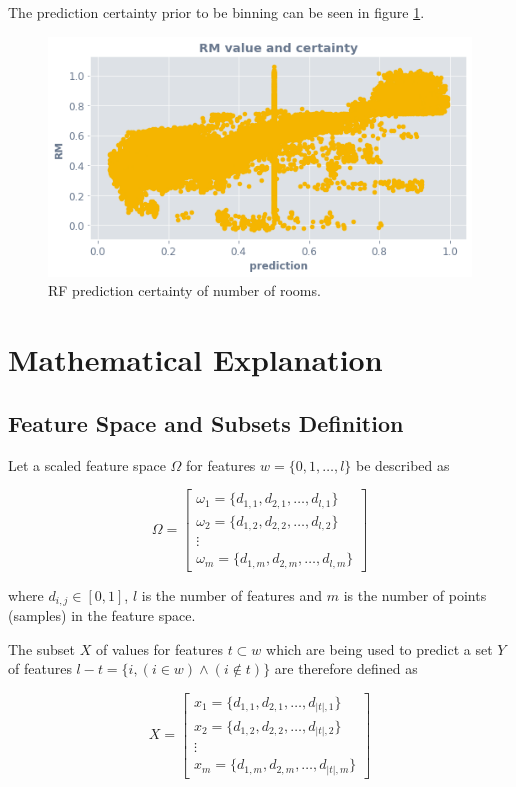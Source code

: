 \documentclass[a4paper, twocolumn]{article}
\begin{document}
The prediction certainty prior to be binning can be seen in figure \ref{fig:reg-rf-ocsvm-rm}.

\begin{figure}
\centering
\includegraphics[width=0.7\columnwidth]{img/reg_rf_ocsvm_rm.png}
\caption{RF prediction certainty of number of rooms.}
\label{fig:reg-rf-ocsvm-rm}
\end{figure}

\section{Mathematical Explanation}

\subsection{Feature Space and Subsets Definition}

Let a scaled feature space $\Omega$ for features $w = \{0, 1, \ldots, l\}$ be described as

$$\Omega =
\begin{bmatrix}
{\omega_1 = \{d_{1, 1}, d_{2, 1}, \ldots, d_{l, 1}\}} \\
{\omega_2 = \{d_{1, 2}, d_{2, 2}, \ldots, d_{l, 2}\}} \\
\vdots \\
{\omega_m = \{d_{1, m}, d_{2, m}, \ldots, d_{l, m}\}}
\end{bmatrix}
$$

where $d_{i, j} \in [0,1]$, $l$ is the number of features and $m$ is the number of points (samples) in the feature space.

The subset $X$ of values for features $t \subset w$ which are being used to predict a set $Y$ of features $l - t = \{i, (i \in w) \land (i \notin t)\}$ are therefore defined as

$$X =
\begin{bmatrix}
{x_1 = \{d_{1, 1}, d_{2, 1}, \ldots, d_{|t|, 1}\}} \\
{x_2 = \{d_{1, 2}, d_{2, 2}, \ldots, d_{|t|, 2}\}} \\
\vdots \\
{x_m = \{d_{1, m}, d_{2, m}, \ldots, d_{|t|, m}\}}
\end{bmatrix}
$$
\end{document}
